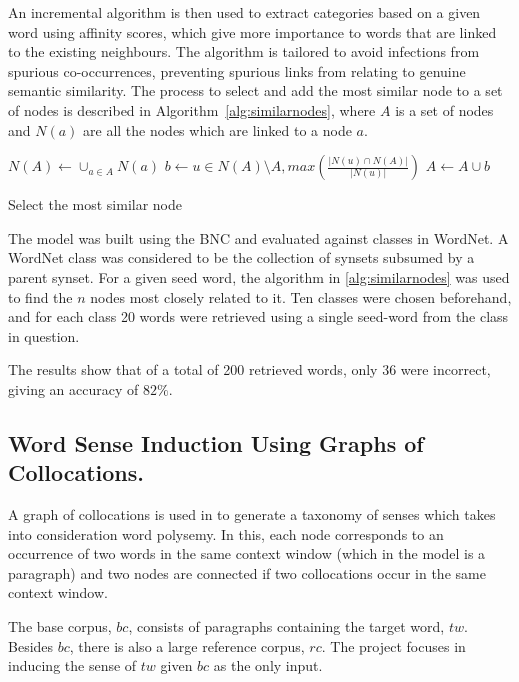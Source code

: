 An incremental algorithm is then used to extract categories based on a given
word using affinity scores, which give more importance to words that are linked
to the existing neighbours. The algorithm is tailored to avoid infections from
spurious co-occurrences, preventing spurious links from relating to genuine
semantic similarity. The process to select and add the most similar node to a
set of nodes is described in Algorithm~\ref{alg:similarnodes}, where $A$ is a
set of nodes and $N(a)$ are all the nodes which are linked to a node $a$.

\begin{algorithm}
 \begin{algorithmic}
  \State $N(A) \gets \cup_{a \in A} N(a)$
  \State $b \gets u \in N(A) \setminus A, max(\frac{|N(u) \cap N(A)|}{|N(u)|})$
  \State $A \gets A \cup b$
 \end{algorithmic}
 \caption{\label{alg:similarnodes} Select the most similar node}
\end{algorithm}

The model was built using the \ac{BNC} and evaluated against classes in
WordNet. A WordNet class was considered to be the collection of synsets
subsumed by a parent synset. For a given seed word, the algorithm in
\ref{alg:similarnodes} was used to find the $n$ nodes most closely related to
it. Ten classes were chosen beforehand, and for each class 20 words were
retrieved using a single seed-word from the class in question.

The results show that of a total of 200 retrieved words, only 36 were
incorrect, giving an accuracy of $82\%$.

\subsection{Word Sense Induction Using Graphs of Collocations.}
\label{sec:collocations}

A graph of collocations is used in \cite{klapaftis2008word} to generate a
taxonomy of senses which takes into consideration word polysemy. In this, each
node corresponds to an occurrence of two words in the same context window (which
in the model is a paragraph) and two nodes are connected if two collocations
occur in the same context window.

The base corpus, $bc$, consists of paragraphs containing the target word, $tw$.
Besides $bc$, there is also a large reference corpus, $rc$. The project focuses
in inducing the sense of $tw$ given $bc$ as the only input.

